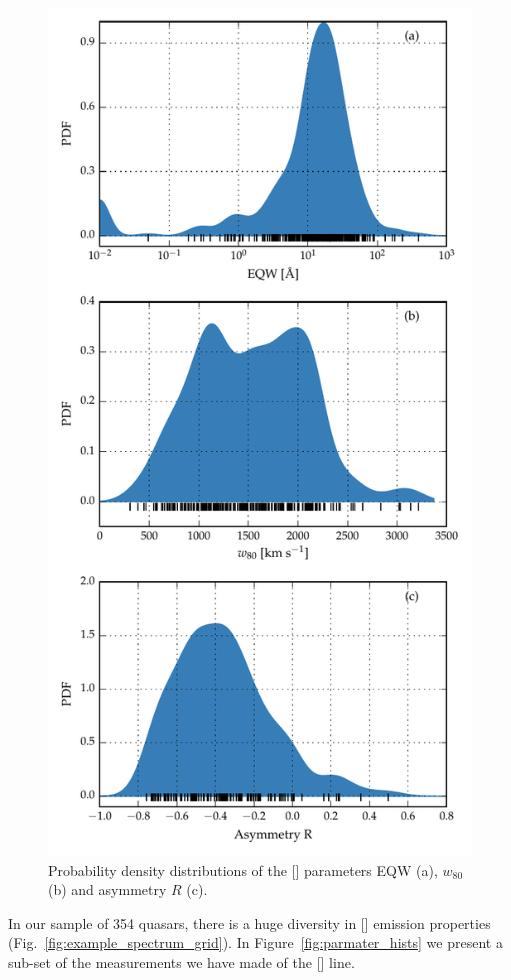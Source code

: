 \begin{figure}
    \centering
    \includegraphics[width=0.8\columnwidth]{figures/chapter04/parameter_hists.pdf} 
    \caption[{Probability density distributions of the [] parameters EQW (a), $w_{80}$ (b) and asymmetry $R$ (c).}]{Probability density distributions of the [] parameters EQW (a), $w_{80}$ (b) and asymmetry $R$ (c).}     
    \label{fig:parameter_hists}
\end{figure}

In our sample of 354 quasars, there is a huge diversity in [] emission properties (Fig.~\ref{fig:example_spectrum_grid}). 
In Figure~\ref{fig:parmater_hists} we present a sub-set of the measurements we have made of the [] line.  

